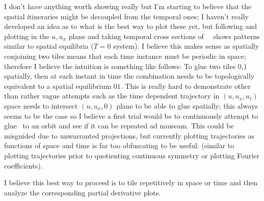 \begin{description}
{\begin{description}
I don't have anything worth showing really but I'm starting to believe that the spatial
itineraries might be decoupled from the temporal ones; I haven't really developed
an idea as to what is the best way to plot these yet, but following 
and plotting in the $u,u_x$ plane and taking temporal cross sections of \spt\ \twots\
shows patterns similar to spatial equilibria ($T=0$ system). I believe this makes
sense as spatially conjoining two tiles means that each time instance must be periodic in space;
therefore I believe the intuition is something like follows: To glue two tiles $0$,$1$ spatially,
then at each instant in time the combination needs to be topologically equivalent to a spatial
equilibrium $01$. This is really hard to demonstrate other than rather vague attempts such
as the time dependent trajectory in $(u,u_x,u_t)$ space needs to intersect $(u,u_x,0)$ plane
to be able to glue spatially; this always seems to be the case so I believe a first
trial would be to continuously attempt to glue \eqva\ to an orbit and see if it can
be repeated ad nauseam. This could be misguided due to unwarranted projections, but
currently plotting trajectories as functions of space and time is far too obfuscating
to be useful. (similar to plotting trajectories prior to quotienting continuous symmetry
or plotting Fourier coefficients).

I believe this best way to proceed is to tile repetitively in space or time and then analyze the
corresponding partial derivative plots.

\end{description}
}

\end{description}
